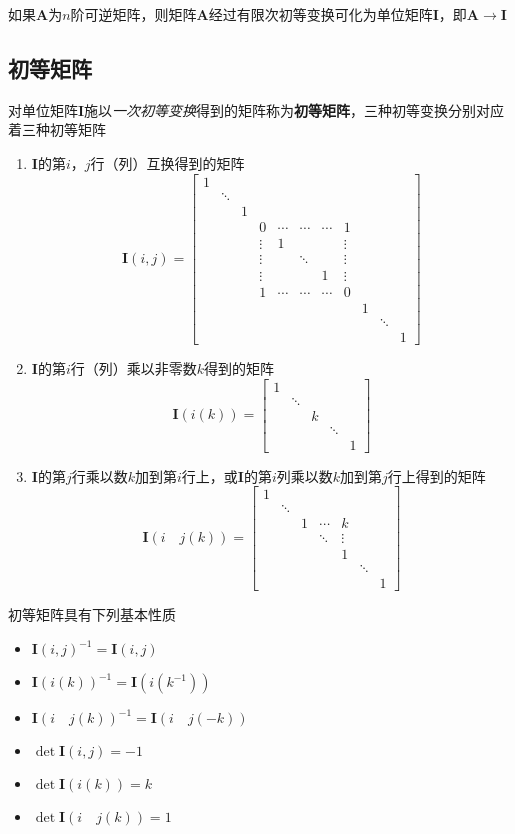 \documentclass[UTF8]{ctexart}
\newcommand{\ve}[1]{{\bm{#1}}}
\newcommand{\mat}[1]{\ve{#1}}
\newcommand{\emplin}{\vspace{1em}}
\begin{document}
如果$\mat{A}$为$n$阶可逆矩阵，则矩阵$\mat{A}$经过有限次初等变换可化为单位矩阵$\mat{I}$，即$\mat{A}\to\mat{I}$

\subsection*{初等矩阵}
对单位矩阵$\mat{I}$施以\emph{一次初等变换}得到的矩阵称为\textbf{初等矩阵}，三种初等变换分别对应着三种初等矩阵
\begin{enumerate}
  \item $\mat{I}$的第$i$，$j$行（列）互换得到的矩阵
  \[\mat{I}(i,j)=\begin{bmatrix}
  1\\
  &\ddots\\
  &&1\\
  &&&0&\cdots&\cdots&\cdots&1\\
  &&&\vdots&1&&&\vdots\\
  &&&\vdots&&\ddots&&\vdots\\
  &&&\vdots&&&1&\vdots\\
  &&&1&\cdots&\cdots&\cdots&0\\
  &&&&&&&&1\\
  &&&&&&&&&\ddots\\
  &&&&&&&&&&1
  \end{bmatrix}\]

  \item $\mat{I}$的第$i$行（列）乘以非零数$k$得到的矩阵
  \[\mat{I}(i(k))=\begin{bmatrix}
  1\\
  &\ddots\\
  &&k\\
  &&&\ddots\\
  &&&&1
  \end{bmatrix}\]

  \item $\mat{I}$的第$j$行乘以数$k$加到第$i$行上，或$\mat{I}$的第$i$列乘以数$k$加到第$j$行上得到的矩阵
  \[\mat{I}(i\quad j(k))=\begin{bmatrix}
  1\\
  &\ddots\\
  &&1&\cdots&k\\
  &&&\ddots&\vdots\\
  &&&&1\\
  &&&&&\ddots\\
  &&&&&&1
  \end{bmatrix}\]
\end{enumerate}

初等矩阵具有下列基本性质
\begin{itemize}
  \item $\displaystyle \mat{I}(i,j)^{-1}=\mat{I}(i,j)$
  \item $\displaystyle \mat{I}(i(k))^{-1}=\mat{I}(i(k^{-1}))$
  \item $\displaystyle \mat{I}(i\quad j(k))^{-1}=\mat{I}(i\quad j(-k))$
  \emplin
  \item $\displaystyle \det\mat{I}(i,j)=-1$
  \item $\displaystyle \det\mat{I}(i(k))=k$
  \item $\displaystyle \det\mat{I}(i\quad j(k))=1$
\end{itemize}
\end{document}

